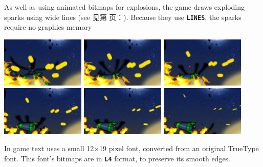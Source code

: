 \documentclass[10pt]{book}
\newcommand{\mach}[1]{\texttt{\textbf{#1}}}
\newcommand{\xref}[1]{见第 \pageref{#1} 页：\textit{\nameref{#1}}}
\begin{document}
\begin{CJK}{UTF8}{gkai}
As well as using animated bitmaps for explosions,
the game draws exploding sparks using wide lines (see \xref{lines}).
Because they use \mach{LINES}, the sparks require no graphics memory
\begin{center}
\includegraphics[width=0.3\textwidth]{assets/ns-lines-0006.png}
\includegraphics[width=0.3\textwidth]{assets/ns-lines-0007.png}
\includegraphics[width=0.3\textwidth]{assets/ns-lines-0008.png}
\includegraphics[width=0.3\textwidth]{assets/ns-lines-0009.png}
\includegraphics[width=0.3\textwidth]{assets/ns-lines-0010.png}
\includegraphics[width=0.3\textwidth]{assets/ns-lines-0011.png}
\end{center}

\noindent
In game text uses a small 12$\times$19 pixel font, converted from an
original TrueType font.
This font's bitmaps are in \mach{L4} format, to preserve its smooth edges.


\end{CJK}
\end{document}
